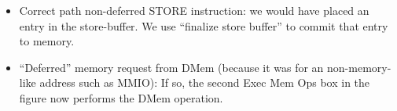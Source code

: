 \begin{itemize}
\begin{tightlist}
       \end{tightlist}

 \item Correct path non-deferred STORE instruction: we would have
        placed an entry in the store-buffer.  We use ``finalize store
        buffer'' to commit that entry to memory.

 \item ``Deferred'' memory request from DMem (because it was for an
       non-memory-like address such as MMIO): If so, the second Exec
       Mem Ops box in the figure now performs the DMem operation.

\end{itemize}

